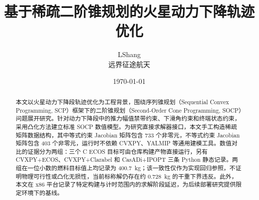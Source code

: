 \documentclass[11pt,a4paper]{article}
\title{基于稀疏二阶锥规划的火星动力下降轨迹优化}
\author{LShang\\\large 远界征途航天}
\date{\today}
\begin{document}
\maketitle

\begin{abstract}
本文以火星动力下降段轨迹优化为工程背景，围绕序列锥规划（Sequential Convex Programming, SCP）框架下的二阶锥规划（Second-Order Cone Programming, SOCP）问题展开研究。针对动力下降段中的推力幅值禁带约束、下滑角约束和终端状态约束，采用凸化方法建立标准 SOCP 数值模型。为研究直接求解器接口，本文手工构造稀疏矩阵数据结构，其中等式约束 Jacobian 矩阵包含 733 个非零元，不等式约束 Jacobian 矩阵包含 403 个非零元，运行时不依赖 CVXPY、YALMIP 等通用建模工具。数值对比的证据分为两组：三个 C ECOS 目标可由仓库构建产物直接运行，另有 CVXPY+ECOS、CVXPY+Clarabel 和 CasADi+IPOPT 三条 Python 静态记录。两组在一位小数的燃料目标值上均记录为 400.7~kg；该一致性仅作为实现回归参照，不证明物理可行性或凸化无损性，当前标称解仍存在约 0.728~kg 的干重下界违反。此外，本文在 x86 平台记录了特定构建与计时范围内的求解阶段延迟，为后续部署研究提供限定环境下的基线。
\end{abstract}











\end{document}
